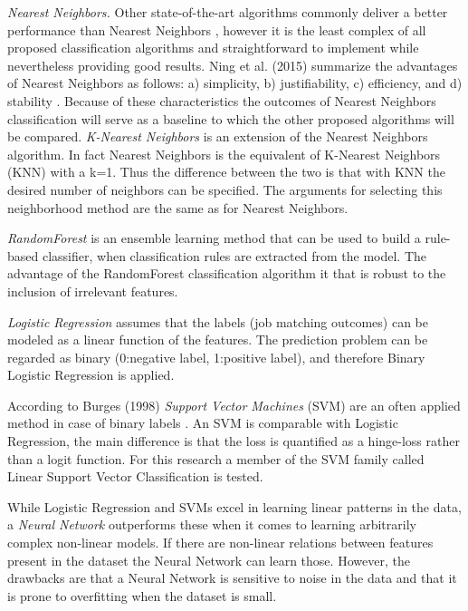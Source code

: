 \textit{Nearest Neighbors.}
Other state-of-the-art algorithms commonly deliver a better performance than Nearest Neighbors \cite{koren2008factorization, takacs2007major}, however it is the least complex of all proposed classification algorithms and straightforward to implement while nevertheless providing good results.
Ning et al. (2015) summarize the advantages of Nearest Neighbors as follows: a) simplicity, b) justifiability, c) efficiency, and d) stability \cite{ning2015comprehensive}.
Because of these characteristics the outcomes of Nearest Neighbors classification will serve as a baseline to which the other proposed algorithms will be compared.
\textit{K-Nearest Neighbors} \cite{altman1992introduction} is an extension of the Nearest Neighbors algorithm. 
In fact Nearest Neighbors is the equivalent of K-Nearest Neighbors (KNN) with a k=1. 
Thus the difference between the two is that with KNN the desired number of neighbors can be specified.
The arguments for selecting this neighborhood method are the same as for Nearest Neighbors.

\textit{RandomForest} \cite{breiman2001random} is an ensemble learning method that can be used to build a rule-based classifier, when classification rules are extracted from the model.
The advantage of the RandomForest classification algorithm it that is robust to the inclusion of irrelevant features.

\textit{Logistic Regression} \cite{hosmer2013applied} assumes that the labels (job matching outcomes) can be modeled as a linear function of the features.
The prediction problem can be regarded as binary (0:negative label, 1:positive label), and therefore Binary Logistic Regression is applied.

According to Burges (1998) \textit{Support Vector Machines} (SVM) are an often applied method in case of binary labels \cite{burges1998tutorial}.
An SVM is comparable with Logistic Regression, the main difference is that the loss is quantified as a hinge-loss rather than a logit function. 
For this research a member of the SVM family called Linear Support Vector Classification is tested.

While Logistic Regression and SVMs excel in learning linear patterns in the data, a \textit{Neural Network} \cite{bishop1995neural} outperforms these when it comes to learning arbitrarily complex non-linear models.
If there are non-linear relations between features present in the dataset the Neural Network can learn those.
However, the drawbacks are that a Neural Network is sensitive to noise in the data and that it is prone to overfitting when the dataset is small. 

